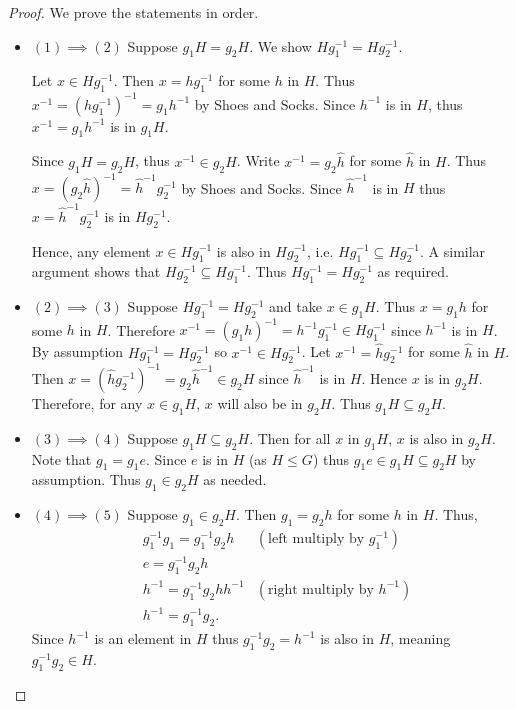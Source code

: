 \begin{proof}
    We prove the statements in order.

    \begin{itemize}
        \item $\boxed{(1) \implies (2)}$ Suppose $g_1H = g_2H$. We show $Hg_1^{-1} = Hg_2^{-1}$.

        Let $x \in Hg_1^{-1}$. Then $x = hg_1^{-1}$ for some $h$ in $H$. Thus $x^{-1} = \left(hg_1^{-1}\right)^{-1} = g_1h^{-1}$ by Shoes and Socks. Since $h^{-1}$ is in $H$, thus $x^{-1} = g_1h^{-1}$ is in $g_1H$.

        Since $g_1H = g_2H$, thus $x^{-1} \in g_2H$. Write $x^{-1} = g_2\hat{h}$ for some $\hat{h}$ in $H$. Thus $x = (g_2\hat{h})^{-1} = \hat{h}^{-1}g_2^{-1}$ by Shoes and Socks. Since $\hat{h}^{-1}$ is in $H$ thus $x = \hat{h}^{-1}g_2^{-1}$ is in $Hg_2^{-1}$.

        Hence, any element $x \in Hg_1^{-1}$ is also in $Hg_2^{-1}$, i.e. $Hg_1^{-1} \subseteq Hg_2^{-1}$. A similar argument shows that $Hg_2^{-1} \subseteq Hg_1^{-1}$. Thus $Hg_1^{-1} = Hg_2^{-1}$ as required.

        \item $\boxed{(2) \implies (3)}$ Suppose $Hg_1^{-1} = Hg_2^{-1}$ and take $x \in g_1H$. Thus $x = g_1h$ for some $h$ in $H$. Therefore $x^{-1} = (g_1h)^{-1} = h^{-1}g_1^{-1} \in Hg_1^{-1}$ since $h^{-1}$ is in $H$. By assumption $Hg_1^{-1} = Hg_2^{-1}$ so $x^{-1} \in Hg_2^{-1}$. Let $x^{-1} = \hat{h}g_2^{-1}$ for some $\hat{h}$ in $H$. Then $x = \left(\hat{h}g_2^{-1}\right)^{-1} = g_2\hat{h}^{-1} \in g_2H$ since $\hat{h}^{-1}$ is in $H$. Hence $x$ is in $g_2H$. Therefore, for any $x \in g_1H$, $x$ will also be in $g_2H$. Thus $g_1H \subseteq g_2H$.

        \item $\boxed{(3) \implies (4)}$
        Suppose $g_1H \subseteq g_2H$. Then for all $x$ in $g_1H$, $x$ is also in $g_2H$. Note that $g_1 = g_1e$. Since $e$ is in $H$ (as $H \leq G$) thus $g_1e \in g_1H \subseteq g_2H$ by assumption. Thus $g_1 \in g_2H$ as needed.

        \item $\boxed{(4) \implies (5)}$
        Suppose $g_1 \in g_2H$. Then $g_1 = g_2h$ for some $h$ in $H$. Thus,
        \begin{align*}
            &g_1^{-1}g_1 = g_1^{-1}g_2h & (\text{left multiply by } g_1^{-1})\\
            &e = g_1^{-1}g_2h\\
            &h^{-1} = g_1^{-1}g_2hh^{-1} & (\text{right multiply by } h^{-1})\\
            &h^{-1} = g_1^{-1}g_2.
        \end{align*}
        Since $h^{-1}$ is an element in $H$ thus $g_1^{-1}g_2 = h^{-1}$ is also in $H$, meaning $g_1^{-1}g_2 \in H$.


\end{itemize}
\end{proof}
